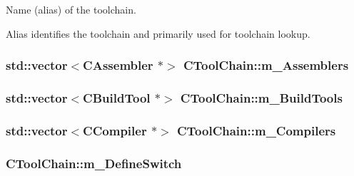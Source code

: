 Name (alias) of the toolchain. 

Alias identifies the toolchain and primarily used for toolchain lookup. \hypertarget{classCToolChain_ab445e06beddaf4236b604f0db7b7ae7e}{
\subsubsection[{m\-\_\-\-Assemblers}]{\setlength{\rightskip}{0pt plus 5cm}std\-::vector$<${\bf C\-Assembler} $\ast$$>$ C\-Tool\-Chain\-::m\-\_\-\-Assemblers\hspace{0.3cm}{\ttfamily [protected]}}}\label{classCToolChain_ab445e06beddaf4236b604f0db7b7ae7e}
\hypertarget{classCToolChain_adf1e742673c39f8e11d3f03d693ecdd1}{
\subsubsection[{m\-\_\-\-Build\-Tools}]{\setlength{\rightskip}{0pt plus 5cm}std\-::vector$<${\bf C\-Build\-Tool} $\ast$$>$ C\-Tool\-Chain\-::m\-\_\-\-Build\-Tools\hspace{0.3cm}{\ttfamily [protected]}}}\label{classCToolChain_adf1e742673c39f8e11d3f03d693ecdd1}
\hypertarget{classCToolChain_a27d13f0c812a8498d320d71b1de8f387}{
\subsubsection[{m\-\_\-\-Compilers}]{\setlength{\rightskip}{0pt plus 5cm}std\-::vector$<${\bf C\-Compiler} $\ast$$>$ C\-Tool\-Chain\-::m\-\_\-\-Compilers\hspace{0.3cm}{\ttfamily [protected]}}}\label{classCToolChain_a27d13f0c812a8498d320d71b1de8f387}
\hypertarget{classCToolChain_a271a979b37f483a3cf68f9fe767e9762}{
\subsubsection[{m\-\_\-\-Define\-Switch}]{ C\-Tool\-Chain\-::m\-\_\-\-Define\-Switch\hspace{0.3cm}{\ttfamily [protected]}}}\label{classCToolChain_a271a979b37f483a3cf68f9fe767e9762}
